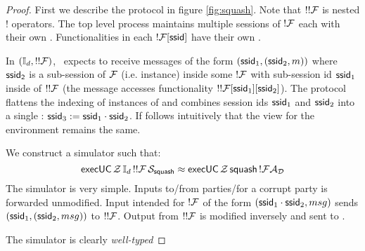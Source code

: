 \begin{proof}
First we describe the  protocol in figure \ref{fig:squash}.
Note that $!!\mathcal{F}$ is nested $!$ operators. The top level process maintains multiple sessions of $!\mathcal{F}$ each with their own .
Functionalities in each $!\mathcal{F}[{\mathsf {ssid}}]$ have their own . 

In $(\mathbb{I}_d, !!\mathcal{F})$, \idealP~expects to receive messages of the form $({\mathsf {ssid}}_1, ({\mathsf {ssid}}_2, m))$ where ${\mathsf {ssid_2}}$ is a sub-session of $\mathcal{F}$ (i.e. instance) inside some $!\mathcal{F}$ with sub-session id ${\mathsf {ssid}}_1$ inside of $!!\mathcal{F}$ (the message accesses functionality $!!\mathcal{F}[{\mathsf {ssid}}_1][{\mathsf {ssid}}_2]$).
The  protocol flattens the indexing of instances of \F and combines session ids ${\mathsf {ssid}}_1$ and ${\mathsf {ssid}}_2$ into a single : ${\mathsf {ssid}}_3 := {\mathsf {ssid}}_1 \cdot {\mathsf {ssid}}_2$.
If follows intuitively that the view for the environment remains the same. 

We construct a simulator such that:
\[
{\mathsf {execUC}} \, \mathcal{Z} \, \mathbb{I}_d \, !!\mathcal{F} \, \mathcal{S}_{{\mathsf {squash}}} \approx {\mathsf {execUC}} \, \mathcal{Z} \, {\mathsf {squash}} \, !\mathcal{F} \mathcal{A}_\mathcal{D} 
\]
The simulator is very simple. 
Inputs to/from parties/\Environment for a corrupt party is forwarded unmodified.
Input intended for $!\mathcal{F}$ of the form $({\mathsf {ssid}}_1 \cdot {\mathsf {ssid}}_2, msg)$ sends $({\mathsf {ssid}}_1, ({\mathsf {ssid}}_2, msg))$ to $!!\mathcal{F}$. 
Output from $!!\mathcal{F}$ is modified inversely and sent to \Environment.

The simulator is clearly \textit{well-typed} 

\end{proof}

